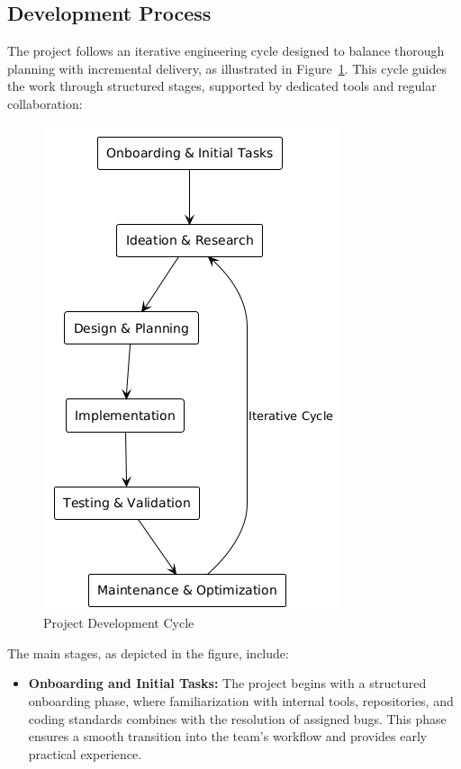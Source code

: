 \begin{spacing}{1.2}
\subsection{Development Process}
The project follows an iterative engineering cycle designed to balance thorough planning with incremental delivery, as illustrated in Figure~\ref{fig:development_cycle}. This cycle guides the work through structured stages, supported by dedicated tools and regular collaboration:

\begin{figure}[H]
    \centering
    \includegraphics[scale=0.5]{Images/dev_process.png}
    \caption{Project Development Cycle}
    \label{fig:development_cycle}
\end{figure}

The main stages, as depicted in the figure, include:

\begin{itemize}
    \item \textbf{Onboarding and Initial Tasks:} The project begins with a structured onboarding phase, where familiarization with internal tools, repositories, and coding standards combines with the resolution of assigned bugs. This phase ensures a smooth transition into the team's workflow and provides early practical experience.


\end{itemize}
\end{spacing}

